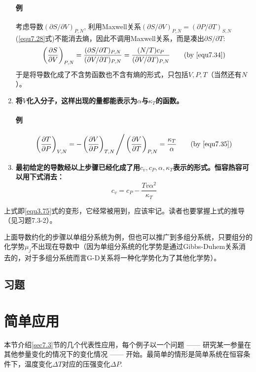\begin{enumerate}
\paragraph{例} 考虑导数$(\partial S / \partial V)_{P, N}$, 利用Maxwell关系$(\partial S / \partial V)_{P, N} = (\partial P / \partial T)_{S, N}$ (\eqref{equ7.28}式)不能消去熵，因此不调用Maxwell关系，而是凑出$\partial S / \partial T$:
\begin{equation}
	\left( \frac{\partial S}{\partial V} \right)_{P, N} = \frac{(\partial S / \partial T)_{P, N}}{(\partial V / \partial T)_{P, N}} = \frac{(N / T) c_P}{(\partial V / \partial T)_{P, N}} \tag{by \eqref{equ7.34}}
\end{equation}
于是将导数化成了不含势函数也不含有熵的形式，只包括$V, P, T$（当然还有$N$）。
\item {\bf 将$V$化入分子，这样出现的量都能表示为$\alpha$与$\kappa_T$的函数。}

\paragraph{例} \begin{equation}
	\left( \frac{\partial T}{\partial P} \right)_{V, N} = -\left( \frac{\partial V}{\partial P} \right)_{T, N} \Bigg/ \left( \frac{\partial V}{\partial T} \right)_{P, N} = \frac{\kappa_T}{\alpha} \tag{by \eqref{equ7.35}}
\end{equation}

\item {\bf 最初给定的导数经以上步骤已经化成了用$c_v, c_P, \alpha, \kappa_T$表示的形式。恒容热容可以用下式消去：}
\begin{equation}
	c_v = c_P - \frac{Tv\alpha^2}{\kappa_T}
\label{equ7.36}
\end{equation}
\end{enumerate}

上式即\eqref{equ3.75}式的变形，它经常被用到，应该牢记。读者也要掌握上式的推导（见习题7.3-2）。

上面导数约化的步骤以单组分系统为例，但也可以推广到多组分系统，只要组分的化学势$\mu_j$不出现在导数中（因为单组分系统的化学势是通过Gibbs-Duhem关系消去的，对于多组分系统而言G-D关系将一种化学势化为了其他化学势）。

\subsection*{习题}

\section{简单应用}
\label{sec7.4}
本节介绍\ref{sec7.3}节的几个代表性应用，每个例子以一个问题 —— 研究某一参量在其他参量变化的情况下的变化情况 —— 开始。最简单的情形是简单系统在恒容条件下，温度变化$\Delta T$对应的压强变化$\Delta P$.

